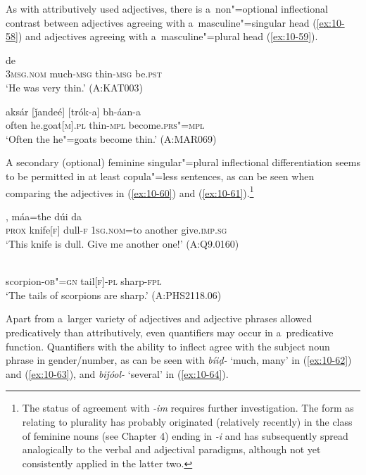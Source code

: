 As with attributively used adjectives, there is a~non"=optional inflectional contrast between adjectives agreeing with a~masculine"=singular head (\ref{ex:10-58}) and adjectives agreeing with a~masculine"=plural head (\ref{ex:10-59}).

\begin{exe}
\ex
\label{ex:10-58}
 de \\
\textsc{3msg.nom} much-\textsc{msg} thin-\textsc{msg} be.\textsc{pst} \\
\glt `He was very thin.' (A:KAT003)

\ex
\label{ex:10-59}
\gll aksár [ǰandeé] [trók-a] bh-áan-a \\
often he.goat[\textsc{m}].\textsc{pl} thin-\textsc{mpl} become.\textsc{prs"=mpl} \\
\glt `Often the he"=goats become thin.' (A:MAR069)
\end{exe}


A secondary (optional) feminine singular"=plural inflectional differentiation seems to be permitted in at least copula"=less sentences, as can be seen when comparing the adjectives in (\ref{ex:10-60}) and (\ref{ex:10-61}).\footnote{The status of agreement with \textit{-im} requires further investigation. The form as relating to plurality has probably originated (relatively recently) in the class of feminine nouns (see Chapter 4) ending in \textit{-i} and has subsequently spread analogically to the verbal and adjectival paradigms, although not yet consistently applied in the latter two.}

\begin{exe}
\ex
\label{ex:10-60}
, máa=the dúi da \\
\textsc{prox} knife[\textsc{f}] dull-\textsc{f} \textsc{1sg.nom=}to another give.\textsc{imp.sg} \\
\glt `This knife is dull. Give me another one!' (A:Q9.0160)

\ex
\label{ex:10-61}
\gll [ṭíinčuk"=am-i laméeṭi-m] [tíiṇ-im] \\ 
scorpion-\textsc{ob"=gn} tail[\textsc{f}]-\textsc{pl } sharp-\textsc{fpl} \\
\glt `The tails of scorpions are sharp.' (A:PHS2118.06)
\end{exe}

Apart from a~larger variety of adjectives and adjective phrases allowed predicatively than attributively, even quantifiers may occur in a~predicative function. Quantifiers with the ability to inflect agree with the subject noun phrase in gender/number, as can be seen with \textit{bíiḍ-} `much, many' in (\ref{ex:10-62}) and (\ref{ex:10-63}), and \textit{biǰóol-} `several' in (\ref{ex:10-64}).

